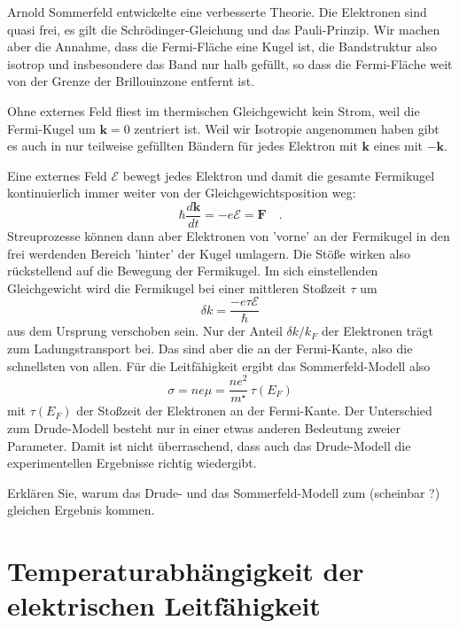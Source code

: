 Arnold Sommerfeld entwickelte eine verbesserte Theorie. Die Elektronen sind quasi frei, es gilt die Schrödinger-Gleichung und das Pauli-Prinzip. Wir machen aber die Annahme, dass die Fermi-Fläche eine Kugel ist, die Bandstruktur also isotrop und insbesondere das Band nur halb gefüllt, so dass die Fermi-Fläche weit von der Grenze der Brillouinzone entfernt ist.

Ohne externes Feld fliest im thermischen Gleichgewicht kein Strom, weil die Fermi-Kugel um $\mathbf{k} = 0$ zentriert ist. Weil wir Isotropie angenommen haben gibt es auch in nur teilweise gefüllten Bändern für jedes Elektron mit $\mathbf{k}$ eines mit  $-\mathbf{k}$.

Eine externes Feld $\bm{\mathcal{E}}$ bewegt  jedes Elektron und damit die gesamte Fermikugel kontinuierlich immer weiter von der Gleichgewichtsposition weg:
\begin{equation}
   \hbar \frac{d \mathbf{k}}{dt} = -e \bm{\mathcal{E}} = \mathbf{F} \quad .
\end{equation}
Streuprozesse können dann aber Elektronen von 'vorne' an der Fermikugel in den frei werdenden Bereich 'hinter' der Kugel umlagern. Die Stöße wirken also rückstellend auf die Bewegung der Fermikugel. Im sich einstellenden Gleichgewicht wird die Fermikugel bei einer mittleren Stoßzeit $\tau$  um 
\begin{equation}
 \delta k = \frac{-e \tau \mathcal{E}}{\hbar}     
\end{equation}  
aus dem Ursprung verschoben sein. Nur der Anteil $\delta k / k_F$ der Elektronen trägt zum Ladungstransport bei. Das sind aber die an der Fermi-Kante, also die schnellsten von allen. Für die Leitfähigkeit ergibt das Sommerfeld-Modell also
\begin{equation}
   \sigma = n e \mu  = \frac{n e^2 }{m^\star} \, \tau(E_F)
\end{equation}
mit $\tau(E_F)$ der Stoßzeit der Elektronen an der Fermi-Kante. Der Unterschied zum Drude-Modell besteht nur in einer etwas anderen Bedeutung zweier Parameter. Damit ist nicht überraschend, dass auch das Drude-Modell die experimentellen Ergebnisse richtig wiedergibt.

\begin{questions} 
    \item Erklären Sie, warum das Drude- und das Sommerfeld-Modell zum (scheinbar ?) gleichen Ergebnis kommen.
\end{questions}
    
    


\section{Temperaturabhängigkeit der elektrischen Leitfähigkeit}

